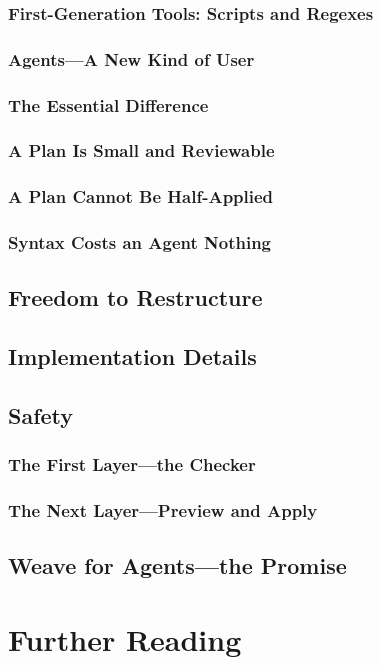 \documentclass[nohyper,nobib]{tufte-book}
\begin{document}
\subsection{First-Generation Tools: Scripts and Regexes}
\subsection{Agents---A New Kind of User}
\subsection{The Essential Difference}
\subsection{A Plan Is Small and Reviewable}
\subsection{A Plan Cannot Be Half-Applied}
\subsection{Syntax Costs an Agent Nothing}
\section{Freedom to Restructure}
\section{Implementation Details}
\section{Safety}
\subsection{The First Layer---the Checker}
\subsection{The Next Layer---Preview and Apply}
\section{Weave for Agents---the Promise}

\chapter{Further Reading}

\backmatter

\printbibliography
\end{document}
